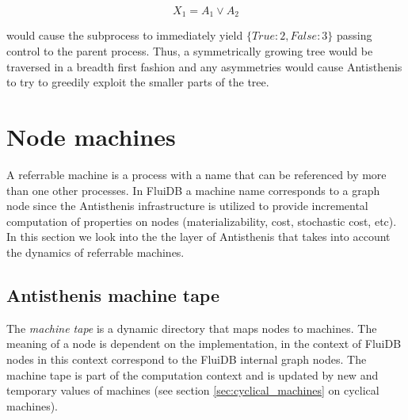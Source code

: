 \[
X_1 = A_1 \lor A_2
\]

would cause the subprocess to immediately yield
\(\{True: 2, False: 3 \}\) passing control to the parent
process. Thus, a symmetrically growing tree would be traversed in a
breadth first fashion and any asymmetries would cause Antisthenis to
try to greedily exploit the smaller parts of the tree.

\section{Node machines}
\label{sec:antisthenis_machines}

A referrable machine is a process with a name that can be referenced
by more than one other processes. In FluiDB a machine name corresponds
to a graph node since the Antisthenis infrastructure is utilized to
provide incremental computation of properties on nodes
(materializability, cost, stochastic cost, etc). In this section we
look into the the layer of Antisthenis that takes into account the
dynamics of referrable machines.

\subsection{Antisthenis machine tape}

The \emph{machine tape} is a dynamic directory that maps nodes to
machines. The meaning of a node is dependent on the implementation, in
the context of FluiDB nodes in this context correspond to the FluiDB
internal graph nodes.  The machine tape is part of the computation
context and is updated by new and temporary values of machines (see
section \ref{sec:cyclical_machines} on cyclical machines).

